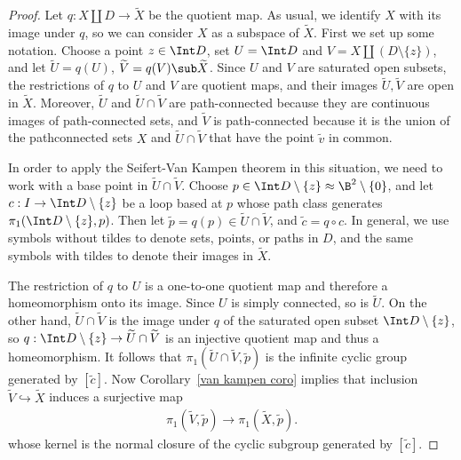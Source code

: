 \begin{proof}
Let $q:X\amalg D\to\widetilde{X}$ be the quotient map. As usual, we identify $X$ with
its image under $q$, so we can consider $X$ as a subspace of $\widetilde{X}$. First we set up some notation. Choose a point $z\in\Int D$, set $U=\Int D$ and $V=X\amalg(D\setminus\{z\})$, and let $\widetilde{U}=q(U)$, $\widetilde{V}=q(V)\sub\widetilde{X}$. Since $U$ and $V$ are saturated open subsets,
the restrictions of $q$ to $U$ and $V$ are quotient maps, and their images $\widetilde{U},\widetilde{V}$ are open in $\widetilde{X}$. Moreover, $\widetilde{U}$ and $\widetilde{U}\cap\widetilde{V}$ are path-connected because they are continuous images of path-connected sets, and $\widetilde{V}$ is path-connected because it is the union of the pathconnected sets $X$ and $\widetilde{U}\cap\widetilde{V}$ that have the point $\widetilde{v}$ in common.\par
In order to apply the Seifert-Van Kampen theorem in this situation, we need to work with a base point in $\widetilde{U}\cap\widetilde{V}$. Choose $p\in\Int D\setminus\{z\}\approx\B^2\setminus\{0\}$, and let $c:I\to\Int D\setminus\{z\}$ be a loop based at $p$ whose path class generates $\pi_1(\Int D\setminus\{z\},p)$. Then
let $\widetilde{p}=q(p)\in\widetilde{U}\cap\widetilde{V}$, and $\widetilde{c}=q\circ c$. In general, we use symbols without tildes to denote sets, points, or paths in $D$, and the same symbols with tildes to denote their images in $\widetilde{X}$.\par
The restriction of $q$ to $U$ is a one-to-one quotient map and therefore a homeomorphism onto its image. Since $U$ is simply connected, so is $\widetilde{U}$. On the other hand, $\widetilde{U}\cap\widetilde{V}$ is the image under $q$ of the saturated open subset $\Int D\setminus\{z\}$, so $q:\Int D\setminus\{z\}\to\widetilde{U}\cap\widetilde{V}$ is an injective quotient map and thus a homeomorphism. It follows that $\pi_1(\widetilde{U}\cap\widetilde{V},\widetilde{p})$ is the infinite cyclic group generated by $[\widetilde{c}]$. Now Corollary~\ref{van kampen coro} implies that inclusion $\widetilde{V}\hookrightarrow\widetilde{X}$ induces a surjective map
\begin{align}\label{attaching idsk-1}
\pi_1(\widetilde{V},\widetilde{p})\to\pi_1(\widetilde{X},\widetilde{p}).
\end{align}
whose kernel is the normal closure of the cyclic subgroup generated by $[\widetilde{c}]$.\par

\end{proof}
